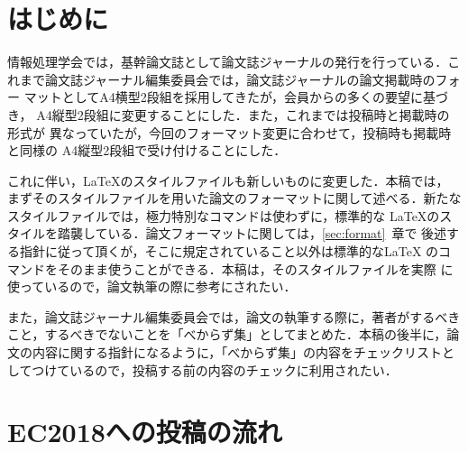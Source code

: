 \section{はじめに}
\label{sec:start}

情報処理学会では，基幹論文誌として論文誌ジャーナルの発行を行っている．こ
れまで論文誌ジャーナル編集委員会では，論文誌ジャーナルの論文掲載時のフォー
マットとしてA4横型2段組を採用してきたが，会員からの多くの要望に基づき，
A4縦型2段組に変更することにした．また，これまでは投稿時と掲載時の形式が
異なっていたが，今回のフォーマット変更に合わせて，投稿時も掲載時と同様の
A4縦型2段組で受け付けることにした．


これに伴い，\LaTeX のスタイルファイルも新しいものに変更した．本稿では，
まずそのスタイルファイルを用いた論文のフォーマットに関して述べる．新たな
スタイルファイルでは，極力特別なコマンドは使わずに，標準的な \LaTeX のス
タイルを踏襲している．論文フォーマットに関しては，\ref{sec:format}~章で
後述する指針に従って頂くが，そこに規定されていること以外は標準的な\LaTeX
のコマンドをそのまま使うことができる．本稿は，そのスタイルファイルを実際
に使っているので，論文執筆の際に参考にされたい．



また，論文誌ジャーナル編集委員会では，論文の執筆する際に，著者がするべき
こと，するべきでないことを「べからず集」としてまとめた．本稿の後半に，論
文の内容に関する指針になるように，「べからず集」の内容をチェックリストと
してつけているので，投稿する前の内容のチェックに利用されたい．

\section{EC2018への投稿の流れ}

